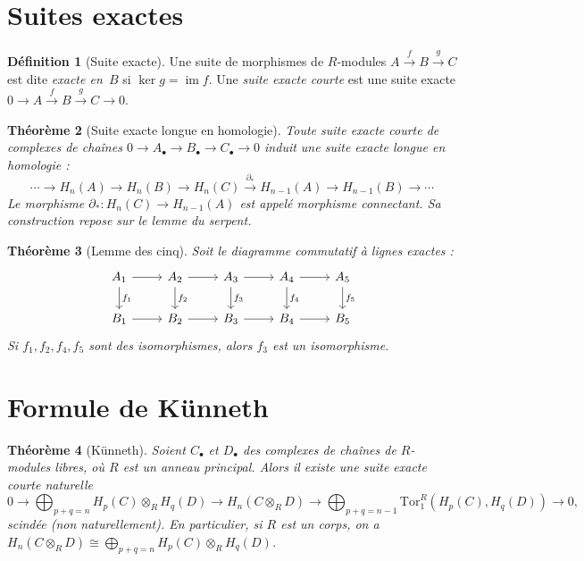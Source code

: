 \documentclass[12pt,a4paper,openany]{book}
\theoremstyle{definition}
\newtheorem{definition}{Définition}[chapter]
\theoremstyle{plain}
\newtheorem{theoreme}[definition]{Théorème}
\theoremstyle{remark}
\DeclareMathOperator{\im}{im}
\begin{document}
\section{Suites exactes}\label{sec:suites-exactes}

\begin{definition}[Suite exacte]\label{def:suite-exacte}
  Une suite de morphismes de $R$-modules
  $A \xrightarrow{f} B \xrightarrow{g} C$
  est dite \emph{exacte en~$B$} si $\ker g = \im f$. Une \emph{suite exacte courte}
   est une suite exacte
  $0 \to A \xrightarrow{f} B \xrightarrow{g} C \to 0$.
\end{definition}

\begin{theoreme}[Suite exacte longue en homologie]\label{thm:sel-homologie}
  Toute suite exacte courte de complexes de chaînes
  $0 \to A_\bullet \to B_\bullet \to C_\bullet \to 0$
  induit une suite exacte longue en homologie :
  \[
    \cdots \to H_n(A) \to H_n(B) \to H_n(C) \xrightarrow{\partial_*}
    H_{n-1}(A) \to H_{n-1}(B) \to \cdots
  \]
  Le morphisme $\partial_* \colon H_n(C) \to H_{n-1}(A)$ est appelé
  \emph{morphisme connectant}. Sa construction repose
  sur le \emph{lemme du serpent}.
\end{theoreme}

\begin{theoreme}[Lemme des cinq]\label{thm:lemme-cinq}
  Soit le diagramme commutatif à lignes exactes :
  \[
    \begin{tikzcd}
      A_1 \ar[r] \ar[d, "f_1"] & A_2 \ar[r] \ar[d, "f_2"] & A_3 \ar[r] \ar[d, "f_3"]
      & A_4 \ar[r] \ar[d, "f_4"] & A_5 \ar[d, "f_5"] \\
      B_1 \ar[r] & B_2 \ar[r] & B_3 \ar[r] & B_4 \ar[r] & B_5
    \end{tikzcd}
  \]
  Si $f_1, f_2, f_4, f_5$ sont des isomorphismes, alors $f_3$ est un isomorphisme.
\end{theoreme}

\section{Formule de Künneth}\label{sec:kunneth-app}

\begin{theoreme}[Künneth]\label{thm:kunneth-app}
  Soient $C_\bullet$ et $D_\bullet$ des complexes de chaînes de $R$-modules libres,
  où $R$ est un anneau principal. Alors il existe une suite exacte courte naturelle
  \[
    0 \to \bigoplus_{p+q=n} H_p(C) \otimes_R H_q(D) \to H_n(C \otimes_R D)
    \to \bigoplus_{p+q=n-1} \mathrm{Tor}_1^R(H_p(C), H_q(D)) \to 0,
  \]
  scindée (non naturellement). En particulier, si $R$ est un corps, on a
  $H_n(C \otimes_R D) \cong \bigoplus_{p+q=n} H_p(C) \otimes_R H_q(D)$.
\end{theoreme}
\end{document}
